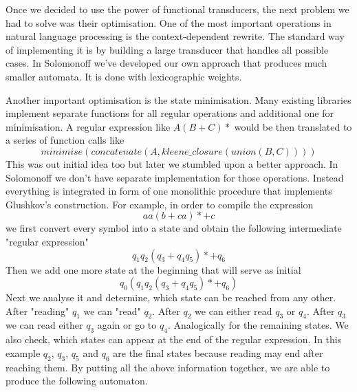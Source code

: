 Once we decided to use the power of functional transducers, the next problem we had to solve was their optimisation. One of the most important operations in natural language processing is the context-dependent rewrite. The standard way of implementing it is by building a large transducer that handles all possible cases.
In Solomonoff we've developed our own approach that produces much smaller automata. It is done with lexicographic weights\cite{MendozaDrosik2020MultitapeAA}.

Another important optimisation is the state minimisation. Many existing libraries implement separate functions for all regular operations and additional one for minimisation. A regular expression like $A(B+C)*$ would be then translated to a series of function calls like 
\[
minimise(concatenate(A,kleene\_closure(union(B,C)))) 
\]
This was out initial idea too but later we stumbled upon a better approach. In Solomonoff we don't have separate implementation for those operations. Instead everything is integrated in form of one monolithic procedure that implements Glushkov's construction. For example, in order to compile the expression
\[
aa(b+ca)*+c
\] we first convert every symbol into a state and obtain the following intermediate "regular expression"  
\[
q_1q_2(q_3+q_4 q_5)*+q_6
\]
Then we add one more state at the beginning that will serve as initial
\[
q_0(q_1q_2(q_3+q_4 q_5)*+q_6)
\]
Next we analyse it and determine, which state can be reached from any other. After "reading" $q_1$ we can "read" $q_2$. After $q_2$ we can either read $q_3$ or $q_4$. After $q_3$ we can read either $q_3$ again or go to $q_4$. Analogically for the remaining states. We also check, which states can appear at the end of the regular expression. In this example $q_2$, $q_3$, $q_5$ and $q_6$ are the final states because reading may end after reaching them. By putting all the above information together, we are able to produce the following automaton.

